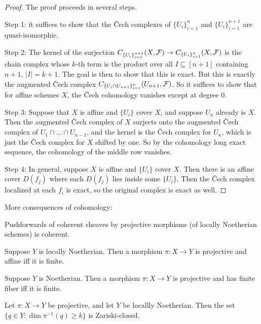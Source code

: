 \documentclass[11pt]{amsart}
\begin{document}
\begin{proof}
    The proof proceeds in several steps.

    Step 1: it suffices to show that the \v{C}ech complexes of $\{U_i\}_{i=1}^n$ and $\{U_i\}_{i=1}^{n+1}$ are quasi-isomorphic.

    Step 2: The kernel of the surjection $C_{\{U_i\}_{i=1}^{n+1}}(X,\mathcal{F}) \twoheadrightarrow C_{\{U_i\}_{i=1}^{n}}(X,\mathcal{F})$ is the chain complex whose $k$-th term is the product over all $I\subseteq[n+1]$ containing $n+1$, $|I|= k +1$. The goal is then to show that this is exact. But this is exactly the augmented \v{C}ech complex $C_{\{U_i\cap U_{n+1}\}_{i=1}^n}(U_{n+1},\mathcal{F})$. So it suffices to show that for affine schemes $X$, the \v{C}ech cohomology vanishes except at degree 0.

    Step 3: Suppose that $X$ is affine and $\{U_i\}$ cover $X$, and suppose $U_{n}$ already is $X$. Then the augmented \v{C}ech complex of $X$ surjects onto the augmented \v{C}ech complex of $U_1\cap\dots \cap U_{n-1}$, and the kernel is the \v{C}ech complex for $U_n$, which is just the \v{C}ech complex for $X$ shifted by one. So by the cohomology long exact sequence, the cohomology of the middle row vanishes.

    Step 4: In general, suppose $X$ is affine and $\{U_i\}$ cover $X$. Then there is an affine cover $D(f_j)$ where each $D(f_j)$ lies inside some $\{U_i\}$. Then the \v{C}ech complex localized at each $f_i$ is exact, so the original complex is exact as well. 
\end{proof}

More consequences of cohomology:

\begin{prop}
    Pushforwards of coherent sheaves by projective morphisms (of locally Noetherian schemes) is coherent.
\end{prop}

\begin{prop}
\label{proj+affine=finite}
    Suppose $Y$ is locally Noetherian. Then a morphism $\pi:X\to Y$ is projective and affine iff it is finite. 
\end{prop}

\begin{prop}
\label{proj+finitefiber=finite}
    Suppose $Y$ is Noetherian. Then a morphism $\pi:X\to Y$ is projective and has finite fiber iff it is finite. 
\end{prop}

\begin{prop}
\label{projFiberDimUppersemicontinuous}
    Let $\pi:X\to Y$ be projective, and let $Y$ be locallly Noetherian. Then the set $\{q\in Y: \dim \pi^{-1}(q) \ge k\}$ is Zariski-closed.
\end{prop}
\end{document}
